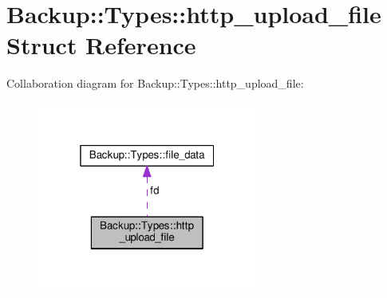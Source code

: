 \hypertarget{struct_backup_1_1_types_1_1http__upload__file}{}\section{Backup\+:\+:Types\+:\+:http\+\_\+upload\+\_\+file Struct Reference}
\label{struct_backup_1_1_types_1_1http__upload__file}


Collaboration diagram for Backup\+:\+:Types\+:\+:http\+\_\+upload\+\_\+file\+:
\nopagebreak
\begin{figure}[H]
\begin{center}
\leavevmode
\includegraphics[width=205pt]{struct_backup_1_1_types_1_1http__upload__file__coll__graph}
\end{center}
\end{figure}

